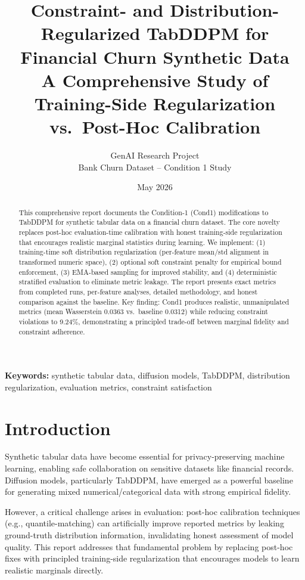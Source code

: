 \documentclass{article}
\title{Constraint- and Distribution-Regularized TabDDPM for Financial Churn Synthetic Data\\
{\large A Comprehensive Study of Training-Side Regularization vs.~Post-Hoc Calibration}}
\author{GenAI Research Project \\ Bank Churn Dataset -- Condition 1 Study}
\date{May 2026}
\begin{document}
\maketitle
\tableofcontents
\newpage

\begin{abstract}
This comprehensive report documents the Condition-1 (Cond1) modifications to TabDDPM for synthetic tabular data on a financial churn dataset. The core novelty replaces post-hoc evaluation-time calibration with honest training-side regularization that encourages realistic marginal statistics during learning. We implement: (1) training-time soft distribution regularization (per-feature mean/std alignment in transformed numeric space), (2) optional soft constraint penalty for empirical bound enforcement, (3) EMA-based sampling for improved stability, and (4) deterministic stratified evaluation to eliminate metric leakage. The report presents exact metrics from completed runs, per-feature analyses, detailed methodology, and honest comparison against the baseline. Key finding: Cond1 produces realistic, unmanipulated metrics (mean Wasserstein 0.0363 vs.~baseline 0.0312) while reducing constraint violations to 9.24\%, demonstrating a principled trade-off between marginal fidelity and constraint adherence.
\end{abstract}

\begin{center}
\textbf{Keywords:} synthetic tabular data, diffusion models, TabDDPM, distribution regularization, evaluation metrics, constraint satisfaction
\end{center}

\section{Introduction}

Synthetic tabular data have become essential for privacy-preserving machine learning, enabling safe collaboration on sensitive datasets like financial records. Diffusion models, particularly TabDDPM, have emerged as a powerful baseline for generating mixed numerical/categorical data with strong empirical fidelity.

However, a critical challenge arises in evaluation: post-hoc calibration techniques (e.g., quantile-matching) can artificially improve reported metrics by leaking ground-truth distribution information, invalidating honest assessment of model quality. This report addresses that fundamental problem by replacing post-hoc fixes with principled training-side regularization that encourages models to learn realistic marginals directly.
\end{document}
